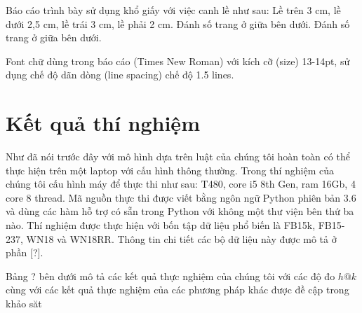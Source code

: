 
 Báo cáo trình bày sử dụng khổ giấy với việc canh lề như sau: Lề trên 3 cm, lề dưới 2,5 cm, lề trái 3 cm, lề phải 2 cm. Đánh số trang ở giữa bên dưới. Đánh số trang ở giữa bên dưới.

Font chữ dùng trong báo cáo (Times New Roman) với kích cỡ (size) 13-14pt, sử dụng chế độ dãn dòng (line spacing) chế độ 1.5 lines.


\section{Kết quả thí nghiệm}
Như đã nói trước đây với mô hình dựa trên luật của chúng tôi hoàn toàn có thể thực hiện trên một laptop với cấu hình thông thường. Trong thí nghiệm của chúng tôi cấu hình máy để thực thi như sau: T480, core i5 8th Gen, ram 16Gb, 4 core 8 thread. Mã nguồn thực thi được viết bằng ngôn ngữ Python phiên bản 3.6 và dùng các hàm hỗ trợ có sẵn trong Python với không một thư viện bên thứ ba nào. Thí nghiệm được thực hiện với bốn tập dữ liệu phổ biến là FB15k, FB15-237, WN18 và WN18RR. Thông tin chi tiết các bộ dữ liệu này được mô tả ở phần [?].

Bảng ? bên dưới mô tả các kết quả thực nghiệm của chúng tôi với các độ đo \(h@k\) cùng với các kết quả thực nghiệm của các phương pháp khác được đề cập trong khảo săt \cite{rossi2020knowledge}

